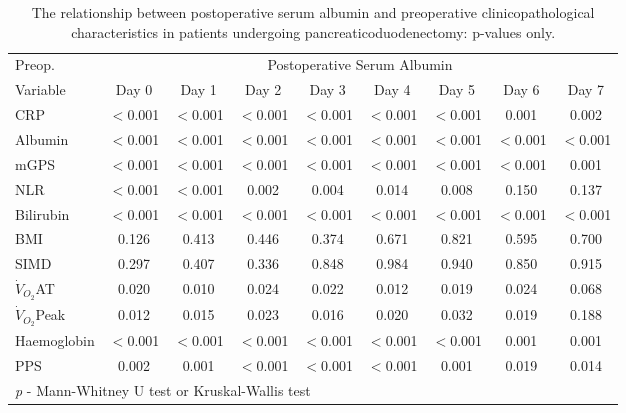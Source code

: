 \begin{sidewaystable}[p]
	\caption{The relationship  between postoperative serum albumin and preoperative clinicopathological characteristics in patients undergoing pancreaticoduodenectomy: p-values only. }
	\label{table:sirs_alb_pvalues}
	\centering
	\renewcommand{\arraystretch}{1.2} %
	\begin{tabular}{|l | c c c c c c c c|}
		\hline
		Preop.              &                   \multicolumn{8}{c|}{Postoperative Serum Albumin}                    \\
		Variable            & Day 0    & Day 1    & Day 2    & Day 3    & Day 4    & Day 5    & Day 6    & Day 7    \\ \hline
		CRP                 & $<$0.001 & $<$0.001 & $<$0.001 & $<$0.001 & $<$0.001 & $<$0.001 & 0.001    & 0.002    \\
		Albumin             & $<$0.001 & $<$0.001 & $<$0.001 & $<$0.001 & $<$0.001 & $<$0.001 & $<$0.001 & $<$0.001 \\
		mGPS                & $<$0.001 & $<$0.001 & $<$0.001 & $<$0.001 & $<$0.001 & $<$0.001 & $<$0.001 & 0.001    \\
		NLR                 & $<$0.001 & $<$0.001 & 0.002    & 0.004    & 0.014    & 0.008    & 0.150    & 0.137    \\
		Bilirubin           & $<$0.001 & $<$0.001 & $<$0.001 & $<$0.001 & $<$0.001 & $<$0.001 & $<$0.001 & $<$0.001 \\
		BMI                 & 0.126    & 0.413    & 0.446    & 0.374    & 0.671    & 0.821    & 0.595    & 0.700    \\
		SIMD                & 0.297    & 0.407    & 0.336    & 0.848    & 0.984    & 0.940    & 0.850    & 0.915    \\
		$\dot{V}_{O_2}$AT   & 0.020    & 0.010    & 0.024    & 0.022    & 0.012    & 0.019    & 0.024    & 0.068    \\
		$\dot{V}_{O_2}$Peak & 0.012    & 0.015    & 0.023    & 0.016    & 0.020    & 0.032    & 0.019    & 0.188    \\
		Haemoglobin         & $<$0.001 & $<$0.001 & $<$0.001 & $<$0.001 & $<$0.001 & $<$0.001 & 0.001    & 0.001    \\
		PPS                 & 0.002    & 0.001    & $<$0.001 & $<$0.001 & $<$0.001 & 0.001    & 0.019    & 0.014    \\ \hline
		\multicolumn{9}{l}{\textit{p} - Mann-Whitney U test or Kruskal-Wallis test}
	\end{tabular}
\end{sidewaystable}